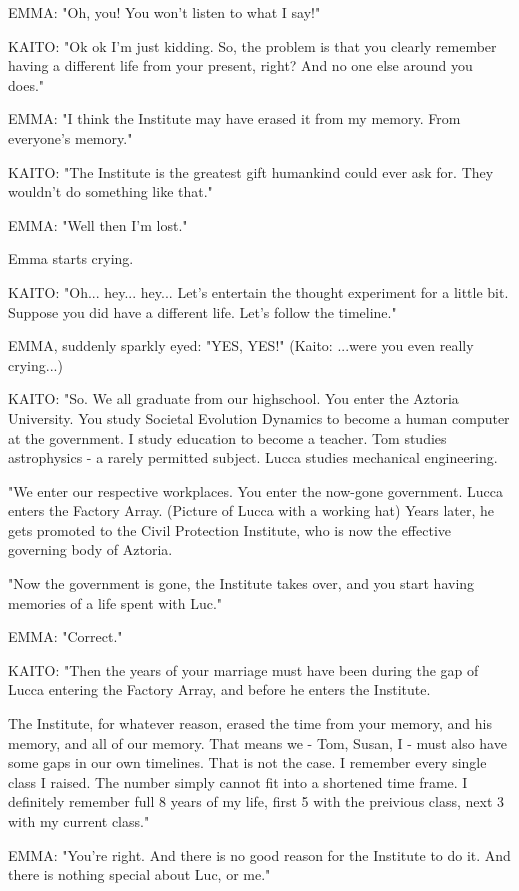 \documentclass[11pt]{article}
\begin{document}
EMMA: "Oh, you! You won't listen to what I say!"

KAITO: "Ok ok I'm just kidding.
So, the problem is that you clearly remember having a different life from your present, right?
And no one else around you does."

EMMA: "I think the Institute may have erased it from my memory.
From everyone's memory."

KAITO: "The Institute is the greatest gift humankind could ever ask for.
They wouldn't do something like that."

EMMA: "Well then I'm lost."

Emma starts crying.

KAITO: "Oh... hey... hey...
Let's entertain the thought experiment for a little bit.
Suppose you did have a different life. 
Let's follow the timeline."

EMMA, suddenly sparkly eyed: "YES, YES!"
(Kaito: ...were you even really crying...)

KAITO: "So. 
We all graduate from our highschool. 
You enter the Aztoria University.
You study Societal Evolution Dynamics to become a human computer at the government.
I study education to become a teacher.
Tom studies astrophysics - a rarely permitted subject.
Lucca studies mechanical engineering.

"We enter our respective workplaces. 
You enter the now-gone government.
Lucca enters the Factory Array. (Picture of Lucca with a working hat)
Years later, he gets promoted to the Civil Protection Institute, who is now the effective governing body of Aztoria.

"Now the government is gone, the Institute takes over, and you start having memories of a life spent with Luc."

EMMA: "Correct."

KAITO: "Then the years of your marriage must have been during the gap of Lucca entering the Factory Array, and before he enters the Institute.

The Institute, for whatever reason, erased the time from your memory, and his memory, and all of our memory. 
That means we - Tom, Susan, I - must also have some gaps in our own timelines.
That is not the case.
I remember every single class I raised. 
The number simply cannot fit into a shortened time frame. 
I definitely remember full 8 years of my life, first 5 with the preivious class, next 3 with my current class."

EMMA: "You're right.
And there is no good reason for the Institute to do it. 
And there is nothing special about Luc, or me."
\end{document}
